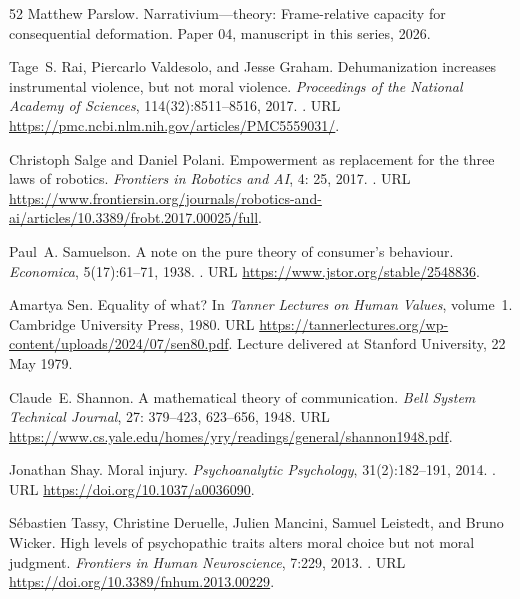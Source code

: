 \documentclass[11pt,a4paper]{article}
\theoremstyle{remark}
\begin{document}
\begin{thebibliography}{52}
Matthew Parslow.
\newblock Narrativium---theory: Frame-relative capacity for consequential
  deformation.
\newblock Paper 04, manuscript in this series, 2026{}.

Tage~S. Rai, Piercarlo Valdesolo, and Jesse Graham.
\newblock Dehumanization increases instrumental violence, but not moral violence.
\newblock \emph{Proceedings of the National Academy of Sciences},
114(32):8511--8516, 2017.
\newblock {}.
\newblock URL \url{https://pmc.ncbi.nlm.nih.gov/articles/PMC5559031/}.

Christoph Salge and Daniel Polani.
\newblock Empowerment as replacement for the three laws of robotics.
\newblock \emph{Frontiers in Robotics and AI}, 4: 25, 2017.
\newblock {}.
\newblock URL
  \url{https://www.frontiersin.org/journals/robotics-and-ai/articles/10.3389/frobt.2017.00025/full}.

Paul~A. Samuelson.
\newblock A note on the pure theory of consumer's behaviour.
\newblock \emph{Economica}, 5(17):61--71, 1938.
\newblock {}.
\newblock URL \url{https://www.jstor.org/stable/2548836}.

Amartya Sen.
\newblock Equality of what?
\newblock In \emph{Tanner Lectures on Human Values}, volume~1. Cambridge
  University Press, 1980.
\newblock URL
  \url{https://tannerlectures.org/wp-content/uploads/2024/07/sen80.pdf}.
\newblock Lecture delivered at Stanford University, 22 May 1979.

Claude~E. Shannon.
\newblock A mathematical theory of communication.
\newblock \emph{Bell System Technical Journal}, 27: 379--423,
  623--656, 1948.
\newblock URL
  \url{https://www.cs.yale.edu/homes/yry/readings/general/shannon1948.pdf}.

Jonathan Shay.
\newblock Moral injury.
\newblock \emph{Psychoanalytic Psychology}, 31(2):182--191, 2014.
\newblock {}.
\newblock URL \url{https://doi.org/10.1037/a0036090}.

S\'{e}bastien Tassy, Christine Deruelle, Julien Mancini, Samuel Leistedt, and Bruno Wicker.
\newblock High levels of psychopathic traits alters moral choice but not moral judgment.
\newblock \emph{Frontiers in Human Neuroscience}, 7:229, 2013.
\newblock {}.
\newblock URL \url{https://doi.org/10.3389/fnhum.2013.00229}.


\end{thebibliography}
\end{document}

